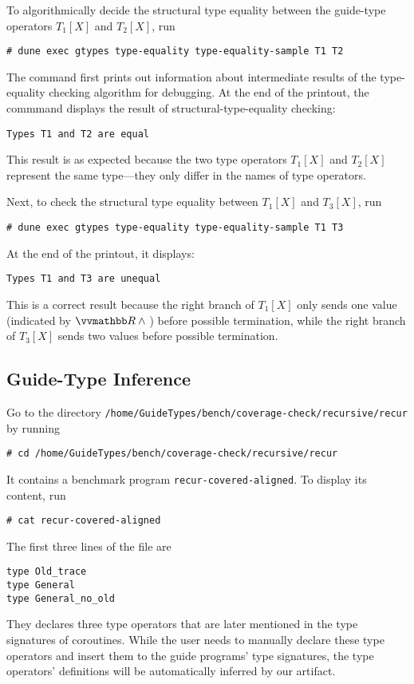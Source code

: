 To algorithmically decide the structural type equality between the guide-type
operators $T_1 [X]$ and $T_2 [X]$, run
\begin{verbatim}
# dune exec gtypes type-equality type-equality-sample T1 T2
\end{verbatim}
%
The command first prints out information about intermediate results of the
type-equality checking algorithm for debugging.
%
At the end of the printout, the commmand displays the result of
structural-type-equality checking:
\begin{verbatim}
Types T1 and T2 are equal
\end{verbatim}
%
This result is as expected because the two type operators $T_1 [X]$ and $T_2
  [X]$ represent the same type---they only differ in the names of type operators.

Next, to check the structural type equality between $T_1 [X]$ and $T_3 [X]$, run
\begin{verbatim}
# dune exec gtypes type-equality type-equality-sample T1 T3
\end{verbatim}
%
At the end of the printout, it displays:
\begin{verbatim}
Types T1 and T3 are unequal
\end{verbatim}
%
This is a correct result because the right branch of $T_1 [X]$ only sends one
value (indicated by $\treal \land {}$) before possible termination, while the
right branch of $T_3 [X]$ sends two values before possible termination.

\subsection{Guide-Type Inference}

Go to the directory
\texttt{/home/GuideTypes/bench/coverage-check/recursive/recur} by running
\begin{verbatim}
# cd /home/GuideTypes/bench/coverage-check/recursive/recur
\end{verbatim}
%
It contains a benchmark program \texttt{recur-covered-aligned}.
%
To display its content, run
\begin{verbatim}
# cat recur-covered-aligned
\end{verbatim}

The first three lines of the file are
\begin{verbatim}
type Old_trace
type General
type General_no_old
\end{verbatim}
%
They declares three type operators that are later mentioned in the type
signatures of coroutines.
%
While the user needs to manually declare these type operators and insert them to
the guide programs' type signatures, the type operators' definitions will be
automatically inferred by our artifact.

